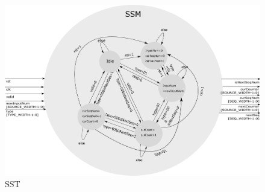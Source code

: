 \begin{figure}
    \includegraphics[width=\textwidth]{Figures/sst.pdf}
    \caption{SST} 
    \label{figure:sst}
\end{figure}
